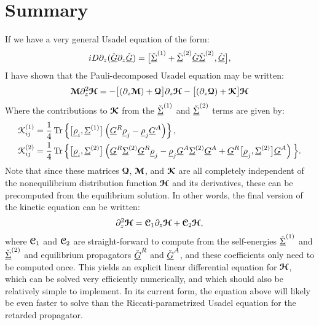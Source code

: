 \section{Summary}
If we have a very general Usadel equation of the form:
\begin{align}
  iD \partial_z(\check{\underline{G}} \partial_z \check{\underline{G}}) = \big[ \check{\underline{\Sigma}}^{(1)} + \check{\underline{\Sigma}}^{(2)}\check{\underline{G}}\check{\underline{\Sigma}}^{(2)}, \check{\underline{G}} \big],
\end{align} 
I have shown that the Pauli-decomposed Usadel equation may be written:
\begin{equation}
  \bm{\mathcal{M}} \partial_z^2 \bm{\mathcal{H}} = -\big[ (\partial_z\bm{\mathcal{M}}) + \bm{\mathcal{Q}} \big] \partial_z \bm{\mathcal{H}} - \big[ (\partial_z \bm{\mathcal{Q}}) + \bm{\mathcal{K}} \big] \bm{\mathcal{H}}
\end{equation}
Where the contributions to $\bm{\mathcal{K}}$ from the $\check{\underline{\Sigma}}^{(1)}$ and $\check{\underline{\Sigma}}^{(2)}$ terms are given by:
\begin{align*}
  \mathcal{K}_{ij}^{(1)}
  &= 
  \frac{1}{4} \operatorname{Tr}\left\{ \big[{\underline{\rho}_i}, {\underline{\Sigma}}^{(1)}\big] \left({\underline{G}}^R {\underline{\rho}}_j - {\underline{\rho}}_j {\underline{G}}^A\right) \right\},
  \\
  \mathcal{K}_{ij}^{(2)}
  &= 
  \frac{1}{4} \operatorname{Tr} 
  \Big\{
      \big[ {\underline{\rho}}_i, {\underline{\Sigma}}^{(2)} \big]
      \left( 
        {\underline{G}}^R {\underline{\Sigma}}^{(2)} {\underline{G}}^R {\underline{\rho}}_j
      - {\underline{\rho}}_j {\underline{G}}^A {\underline{\Sigma}}^{(2)} {\underline{G}}^A
      + {\underline{G}}^R \big[{\underline{\rho}}_j, {\underline{\Sigma}}^{(2)} \big] {\underline{G}}^A
      \right)
  \Big\}.
\end{align*}
Note that since these matrices $\bm{\mathcal{Q}}$, $\bm{\mathcal{M}}$, and $\bm{\mathcal{K}}$ are all completely independent of the nonequilibrium distribution function $\bm{\mathcal{H}}$ and its derivatives, these can be precomputed from the equilibrium solution.
In other words, the final version of the kinetic equation can be written:
\begin{equation}
  \partial_z^2\bm{\mathcal{H}} = \bm{\mathcal{C}}_1 \partial_z \bm{\mathcal{H}} + \bm{\mathcal{C}}_2 \bm{\mathcal{H}},
\end{equation}
where $\bm{\mathcal{C}}_1$ and $\bm{\mathcal{C}}_2$ are straight-forward to compute from the self-energies ${\check{\underline{\Sigma}}}^{(1)}$ and ${\check{\underline{\Sigma}}}^{(2)}$ and equilibrium propagators ${\check{\underline{G}}}^R$ and ${\check{\underline{G}}}^A$, and these coefficients only need to be computed once.
This yields an explicit linear differential equation for $\bm{\mathcal{H}}$, which can be solved very efficiently numerically, and which should also be relatively simple to implement.
In its current form, the equation above will likely be even faster to solve than the Riccati-parametrized Usadel equation for the retarded propagator.

